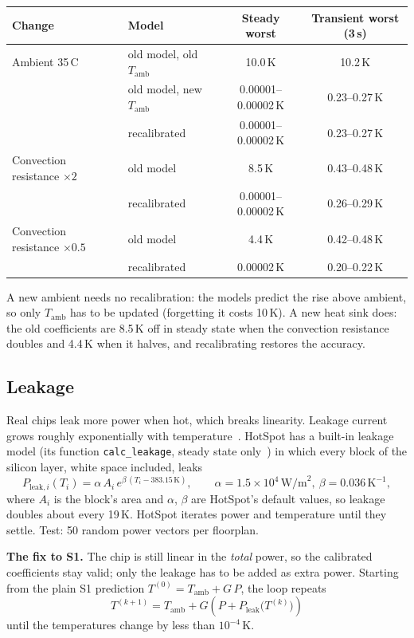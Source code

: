 \documentclass[11pt,a4paper]{article}
\newcommand{\degC}{\,\textdegree C}
\begin{document}
\begin{center}
\small
\begin{tabular}{@{}l l c c@{}}
\toprule
Change & Model & Steady worst & Transient worst (3\,s) \\
\midrule
Ambient 35\degC & old model, old $T_\text{amb}$ & 10.0\,K & 10.2\,K \\
 & old model, new $T_\text{amb}$ & 0.00001--0.00002\,K & 0.23--0.27\,K \\
 & recalibrated & 0.00001--0.00002\,K & 0.23--0.27\,K \\
\midrule
Convection resistance $\times 2$ & old model & 8.5\,K & 0.43--0.48\,K \\
 & recalibrated & 0.00001--0.00002\,K & 0.26--0.29\,K \\
\midrule
Convection resistance $\times 0.5$ & old model & 4.4\,K & 0.42--0.48\,K \\
 & recalibrated & 0.00002\,K & 0.20--0.22\,K \\
\bottomrule
\end{tabular}
\end{center}
A new ambient needs no recalibration: the models predict the rise above ambient, so only
$T_\text{amb}$ has to be updated (forgetting it costs 10\,K). A new heat sink does: the old
coefficients are 8.5\,K off in steady state when the convection resistance doubles and 4.4\,K when
it halves, and recalibrating restores the accuracy.

\subsection{Leakage}
Real chips leak more power when hot, which breaks linearity. Leakage current grows roughly
exponentially with temperature~\cite{liao05}. HotSpot has a built-in leakage model (its function
\texttt{calc\_leakage}, steady state only~\cite{hotspot6}) in which every block of the silicon
layer, white space included, leaks
\begin{equation}
  P_{\text{leak},i}(T_i) = \alpha\, A_i\, e^{\beta\,(T_i - 383.15\,\text{K})},
  \qquad \alpha = 1.5\times10^{4}\,\text{W/m}^2,\ \beta = 0.036\,\text{K}^{-1},
  \label{eq:leak}
\end{equation}
where $A_i$ is the block's area and $\alpha$, $\beta$ are HotSpot's default values, so leakage
doubles about every 19\,K. HotSpot iterates power and temperature until they settle. Test: 50
random power vectors per floorplan.

\textbf{The fix to S1.} The chip is still linear in the \emph{total} power, so the calibrated
coefficients stay valid; only the leakage has to be added as extra power. Starting from the plain S1 prediction $T^{(0)} = T_\text{amb} + G\,P$, the loop repeats
\begin{equation}
  T^{(k+1)} = T_\text{amb} + G\left(P + P_\text{leak}\big(T^{(k)}\big)\right)
  \label{eq:leakloop}
\end{equation}
until the temperatures change by less than $10^{-4}$\,K.
\end{document}
